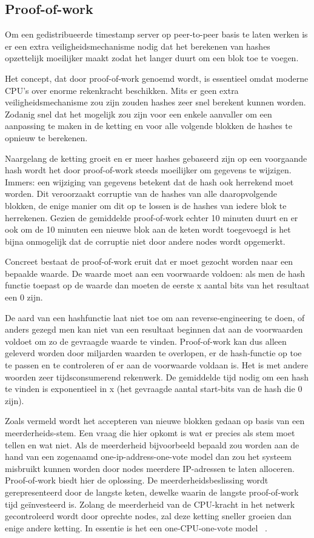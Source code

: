 	\subsection{Proof-of-work}
	\label{subsec:pow}
	Om een gedistribueerde timestamp server op peer-to-peer basis te laten werken is er een extra veiligheidsmechanisme nodig dat het berekenen van hashes opzettelijk moeilijker maakt zodat het langer duurt om een blok toe te voegen. 
	
	Het concept, dat door \textcite{Nakamoto2008} proof-of-work genoemd wordt, is essentieel omdat moderne CPU’s over enorme rekenkracht beschikken. Mits er geen extra veiligheidsmechanisme zou zijn zouden hashes zeer snel berekent kunnen worden. Zodanig snel dat het mogelijk zou zijn voor een enkele aanvaller om een aanpassing te maken in de ketting en voor alle volgende blokken de hashes te opnieuw te berekenen. 
	
	Naargelang de ketting groeit en er meer hashes gebaseerd zijn op een voorgaande hash wordt het door proof-of-work steeds moeilijker om gegevens te wijzigen. Immers: een wijziging van gegevens betekent dat de hash ook herrekend moet worden. Dit veroorzaakt corruptie van de hashes van alle daaropvolgende blokken, de enige manier om dit op te lossen is de hashes van iedere blok te herrekenen. 
	Gezien de gemiddelde proof-of-work echter 10 minuten duurt en er ook om de 10 minuten een nieuwe blok aan de keten wordt toegevoegd is het bijna onmogelijk dat de corruptie niet door andere nodes wordt opgemerkt.
	
	Concreet bestaat de proof-of-work eruit dat er moet gezocht worden naar een bepaalde waarde. De waarde moet aan een voorwaarde voldoen: als men de hash functie toepast op de waarde dan moeten de eerste x aantal bits van het resultaat een 0 zijn. 
	
	De aard van een hashfunctie laat niet toe om aan reverse-engineering te doen, of anders gezegd men kan niet van een resultaat beginnen dat aan de voorwaarden voldoet om zo de gevraagde waarde te vinden. Proof-of-work kan dus alleen geleverd worden door miljarden waarden te overlopen, er de hash-functie op toe te passen en te controleren of er aan de voorwaarde voldaan is. Het is met andere woorden zeer tijdsconsumerend rekenwerk. De gemiddelde tijd nodig om een hash te vinden is exponentieel in x (het gevraagde aantal start-bits van de hash die 0 zijn).
	
	Zoals vermeld wordt het accepteren van nieuwe blokken gedaan op basis van een meerderheids-stem. Een vraag die hier opkomt is wat er precies als stem moet tellen en wat niet. Als de meerderheid bijvoorbeeld bepaald zou worden aan de hand van een zogenaamd one-ip-address-one-vote model dan zou het systeem misbruikt kunnen worden door nodes meerdere IP-adressen te laten alloceren. Proof-of-work biedt hier de oplossing. De meerderheidsbeslissing wordt gerepresenteerd door de langste keten, dewelke waarin de langste proof-of-work tijd geïnvesteerd is. Zolang de meerderheid van de CPU-kracht in het netwerk gecontroleerd wordt door oprechte nodes, zal deze ketting sneller groeien dan enige andere ketting. In essentie is het een one-CPU-one-vote model ~\autocite{Nakamoto2008}.
	
